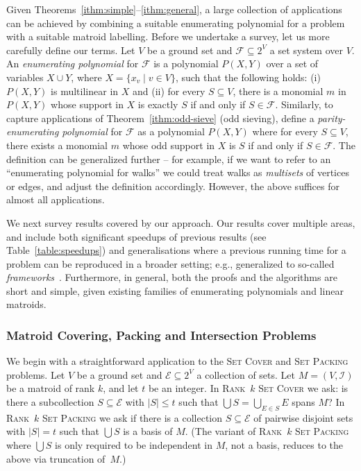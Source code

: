 \documentclass{theoretics}
\newcommand{\cI}{\ensuremath{\mathcal I}\xspace}
\newcommand{\cE}{\ensuremath{\mathcal E}\xspace}
\newcommand{\cF}{\ensuremath{\mathcal F}\xspace}
\begin{document}
Given Theorems~\ref{ithm:simple}--\ref{ithm:general},
a large collection of applications can be achieved by combining a
suitable enumerating polynomial for a problem with a suitable matroid labelling. 
Before we undertake a survey, let us more carefully define our terms. 
Let $V$ be a ground set and $\cF \subseteq 2^V$ a set system over $V$.
An \emph{enumerating polynomial} for $\cF$ is a polynomial $P(X,Y)$
over a set of variables $X \cup Y$, where $X=\{x_v \mid v \in V\}$,
such that the following holds:
(i) $P(X,Y)$ is multilinear in $X$
and (ii) for every $S \subseteq V$, there is a monomial $m$ in $P(X,Y)$
  whose support in $X$ is exactly $S$ if and only if $S \in \cF$.
Similarly, to capture applications of Theorem~\ref{ithm:odd-sieve} (odd sieving),
define a \emph{parity-enumerating polynomial} for $\cF$ as a
polynomial $P(X,Y)$ where for every $S \subseteq V$, there exists a monomial $m$
whose odd support in $X$ is $S$ if and only if $S \in \cF$.
The definition can be generalized further -- for example, if we want to
refer to an ``enumerating polynomial for walks'' we could treat walks
as \emph{multisets} of vertices or edges, and adjust the definition
accordingly. However, the above suffices for almost all applications. 

We next survey results covered by our approach. Our results cover
multiple areas, and include
both significant speedups of previous results (see Table~\ref{table:speedups})
and generalisations where a previous running time for a problem can
be reproduced in a broader setting; e.g., generalized to so-called
\emph{frameworks}~\cite{FominGKSS24,Lovasz1977,LovaszGeomBook2019}.
Furthermore, in general, both
the proofs and the algorithms are short and simple,
given existing families of enumerating polynomials and linear matroids. 


\subsubsection{Matroid Covering, Packing and Intersection Problems}
\label{sec:intro-appl-matroids}
We begin with a straightforward application to the
\textsc{Set Cover} and \textsc{Set Packing} problems. 
Let $V$ be a ground set and $\cE \subseteq 2^V$ a collection of sets.
Let $M=(V,\cI)$ be a matroid of rank $k$, and let $t$ be an integer.
In \textsc{Rank~$k$ Set Cover} we ask: is there a subcollection
$S \subseteq \cE$ with $|S| \leq t$ such that $\bigcup S = \bigcup_{E \in S} E$ spans $M$?
In \textsc{Rank~$k$ Set Packing} we ask if there is
a collection $S \subseteq \cE$
of pairwise disjoint sets
with $|S|=t$ such that
$\bigcup S$ is a basis of $M$. 
(The variant of \textsc{Rank~$k$ Set Packing} where $\bigcup S$
is only required to be independent in $M$, not a basis,
reduces to the above via truncation of~$M$.)
\end{document}
